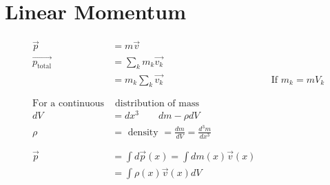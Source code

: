 \documentclass[12pt]{article}
\begin{document}
\section{Linear Momentum}
\begin{align*}
	\overrightarrow{p}              & = m \overrightarrow{v}                                                                       \\
	\overrightarrow{p_\text{total}} & = \sum_k m_k \overrightarrow{v_k}                                                            \\
	                                & = m_k \sum_k \overrightarrow{v_k}                                &  & \text{If } m_k = m V_k \\
	\phantom{=}                                                                                                                    \\
	\text{For a continuous}         & \text{ distribution of mass}                                                                 \\
	dV                              & = dx^3 \qquad dm - \rho dV                                                                   \\
	\rho                            & = \text{ density } = \frac{dm}{dV} = \frac{d^3m}{dx^3}                                       \\
	\phantom{=}                                                                                                                    \\
	\overrightarrow{p}              & = \int d\overrightarrow{p}(x) = \int dm(x) \overrightarrow{v}(x)                             \\
	                                & = \int \rho(x) \overrightarrow{v}(x) dV                                                      \\
\end{align*}
\end{document}
